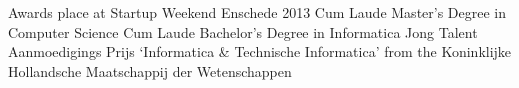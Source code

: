 
\begin{rubric}{Awards}
		 place at Startup Weekend Enschede 2013 \hfill{}
		Cum Laude Master's Degree in Computer Science
		Cum Laude Bachelor's Degree in Informatica
		Jong Talent Aanmoedigings Prijs `Informatica \& Technische Informatica'
		from the Koninklijke Hollandsche Maatschappij der Wetenschappen
		\hfill{}
\end{rubric}
